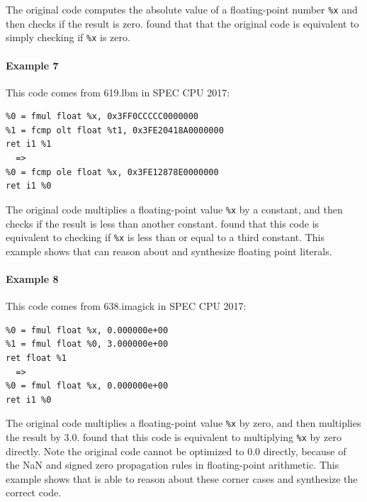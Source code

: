 The original code computes the absolute value of a floating-point
number \texttt{\%x} and then checks if the result is zero.
\minotaur{} found that that the original code is equivalent to simply checking if
\texttt{\%x} is zero.


\paragraph*{Example 7}

This code comes from 619.lbm in SPEC CPU 2017:


{\begin{quoting}\begin{Verbatim}
%0 = fmul float %x, 0x3FF0CCCCC0000000
%1 = fcmp olt float %t1, 0x3FE20418A0000000
ret i1 %1
  =>
%0 = fcmp ole float %x, 0x3FE12878E0000000
ret i1 %0
\end{Verbatim}
\end{quoting}}

The original code multiplies a floating-point value \texttt{\%x} by a
constant, and then checks if the result is less than another constant.
\minotaur{} found that this code is equivalent to checking if \texttt{\%x}
is less than or equal to a third constant.
%
This example shows that \minotaur{} can reason about and synthesize floating
point literals.


\paragraph*{Example 8}

This code comes from 638.imagick in SPEC CPU 2017:

{\begin{quoting}\begin{Verbatim}
%0 = fmul float %x, 0.000000e+00
%1 = fmul float %0, 3.000000e+00
ret float %1
  =>
%0 = fmul float %x, 0.000000e+00
ret i1 %0
\end{Verbatim}
\end{quoting}}

The original code multiplies a floating-point value \texttt{\%x} by
zero, and then multiplies the result by 3.0. \minotaur{} found that this
code is equivalent to multiplying \texttt{\%x} by zero directly.
Note the original code cannot be optimized to 0.0 directly, because of
the NaN and signed zero propagation rules in floating-point arithmetic.
This example shows that \minotaur{} is able to reason about these corner
cases and synthesize the correct code.

